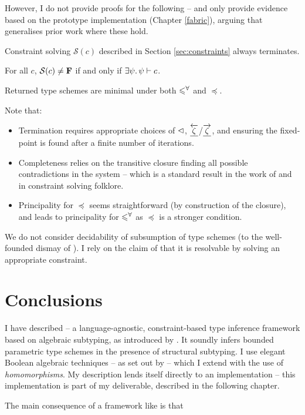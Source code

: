 However, I do not provide proofs for the following -- and only provide evidence based on the prototype implementation (Chapter \ref{fabric}), arguing that \inference{} generalises prior work where these hold. 

\begin{conjecture}[Termination]
    Constraint solving $\mathcal S(c)$ described in Section \ref{sec:constraints} always terminates.
\end{conjecture}

\begin{conjecture}[Completeness]    
    For all $c$, $\mathcal S(c) \ne \mathbf F$ if and only if $\exists \psi \ldotp \psi \vdash c$.
\end{conjecture}

\begin{conjecture}[Principality]
    Returned type schemes are minimal under both $\leqslant^\forall$ and $\preceq$.
\end{conjecture}

Note that: \begin{itemize}
    \item Termination requires appropriate choices of $\lhd$, $\underline{\overleftarrow{\zeta}}$/$\underline{\overrightarrow{\zeta}}$, and ensuring the fixed-point is found after a finite number of iterations.
    \item Completeness relies on the transitive closure finding all possible contradictions in the system -- which is a standard result in the work of \textcite{pottier-framework} and in constraint solving folklore.
    \item Principality for $\preceq$ seems straightforward (by construction of the closure), and leads to principality for $\leqslant^\forall$ as $\preceq$ is a stronger condition.
\end{itemize}
We do not consider decidability of subsumption of type schemes (to the well-founded dismay of \textcite{dolan-thesis}). I rely on the claim of \textcite{mlstruct} that it is resolvable by solving an appropriate constraint.

\section{Conclusions}
\label{sec:conclusions}

I have described \inference{} -- a language-agnostic, constraint-based type inference framework based on algebraic subtyping, as introduced by \textcite{mlsub}.
It soundly infers bounded parametric type schemes in the presence of structural subtyping. 
I use elegant Boolean algebraic techniques -- as set out by \textcite{mlstruct} -- which I extend with the use of \emph{homomorphisms}. 
My description lends itself directly to an implementation -- this implementation is part of my deliverable, described in the following chapter.

The main consequence of a framework like \inference{} is that 



